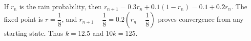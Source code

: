 If $r_n$ is the rain probability, then $r_{n+1}=0.3r_n+0.1(1-r_n)=0.1+0.2r_n$. The fixed point is $r=\dfrac{1}{8}$, and $r_{n+1}-\dfrac{1}{8}=0.2(r_n-\dfrac{1}{8})$ proves convergence from any starting state. Thus $k=12.5$ and $\boxed{10k=125}$.
